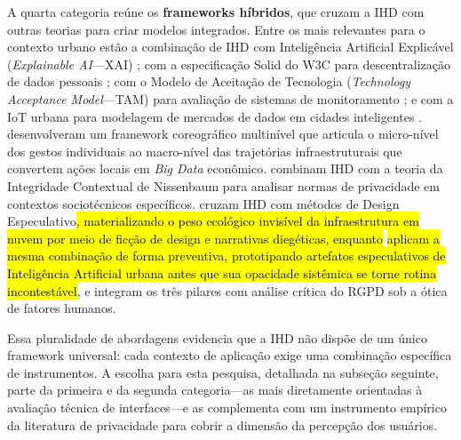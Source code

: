\documentclass[
	12pt,				%
	oneside,			%
	a4paper,			%
	english,			%
	brazil				%
	]{abntex2ppgsi}
\newcommand{\hlciteonline}[1]{\colorbox{yellow}{\citeonline{#1}}} %
\begin{document}
    A quarta categoria reúne os \textbf{frameworks híbridos}, que cruzam a IHD com outras teorias para criar modelos integrados. Entre os mais relevantes para o contexto urbano estão a combinação de IHD com Inteligência Artificial Explicável (\textit{Explainable AI}---XAI) 
    \cite{Refat2023, DeAlmeida2019}; com a especificação Solid do W3C para descentralização de dados pessoais \cite{DeKreij2024}; com o Modelo de Aceitação de Tecnologia (\textit{Technology Acceptance Model}---TAM) 
    para avaliação de sistemas de monitoramento \cite{Zou2020769}; e com a IoT urbana para modelagem de mercados de dados em cidades inteligentes \cite{Mashhadi2014}.  desenvolveram um framework coreográfico multinível que articula o micro-nível dos gestos individuais ao macro-nível das trajetórias infraestruturais que convertem 
    ações locais em \textit{Big Data} econômico.  combinam IHD com a teoria da Integridade Contextual de Nissenbaum para analisar normas de privacidade em contextos sociotécnicos específicos.  cruzam IHD com métodos de Design Especulativo\hl{, materializando o peso ecológico invisível da infraestrutura em nuvem por meio de ficção de design e narrativas diegéticas, enquanto} \hlciteonline{pilling2022experiencing} \hl{aplicam a mesma combinação de forma preventiva, prototipando artefatos especulativos de Inteligência Artificial urbana antes que sua opacidade sistêmica se torne rotina incontestável}, e  integram os três pilares com análise crítica do RGPD sob a ótica de fatores humanos.

    Essa pluralidade de abordagens evidencia que a IHD não dispõe de um único framework universal: cada contexto de aplicação exige uma combinação específica de instrumentos. A escolha para esta pesquisa, detalhada na subseção seguinte, parte da primeira e da segunda categoria---as mais diretamente orientadas à avaliação técnica de 
    interfaces---e as complementa com um instrumento empírico da literatura de privacidade para cobrir a dimensão da percepção dos usuários.
\end{document}
